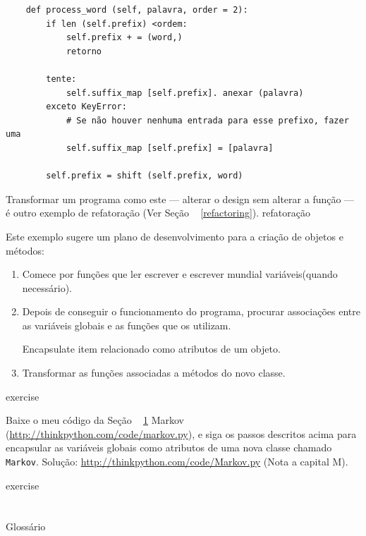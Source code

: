\documentclass[10pt]{book}
\begin{document}
\begin{exercise}
\begin{v erbatim}
\begin{verbatim}
    def process_word (self, palavra, order = 2):
        if len (self.prefix) <ordem:
            self.prefix + = (word,)
            retorno

        tente:
            self.suffix_map [self.prefix]. anexar (palavra)
        exceto KeyError:
            # Se não houver nenhuma entrada para esse prefixo, fazer uma
            self.suffix_map [self.prefix] = [palavra]

        self.prefix = shift (self.prefix, word)        
\end{verbatim}

Transformar um programa como este --- alterar o design sem
alterar a função --- é outro exemplo de refatoração
(Ver Seção ~ \ref {refactoring}).
\index{} refatoração

Este exemplo sugere um plano de desenvolvimento para a criação de objetos e
métodos:

\begin{enumerate}

\item Comece por funções que ler escrever e escrever mundial
variáveis ​​(quando necessário).

\item Depois de conseguir o funcionamento do programa, procurar associações
entre as variáveis ​​globais e as funções que os utilizam.

 ​​Encapsulate item relacionado como atributos de um objeto.

\item Transformar as funções associadas a métodos do novo
classe.

\end{enumerate}


\begin{} exercise

Baixe o meu código da Seção ~ \ref {} Markov
(\url{http://thinkpython.com/code/markov.py}), e siga os passos descritos
acima para encapsular as variáveis ​​globais como atributos de uma nova classe
chamado {\tt Markov}. Solução: \url{http://thinkpython.com/code/Markov.py}
(Nota a capital M).

\end{} exercise




\section{} Glossário


\end{v erbatim}
\end{exercise}
\end{document}
